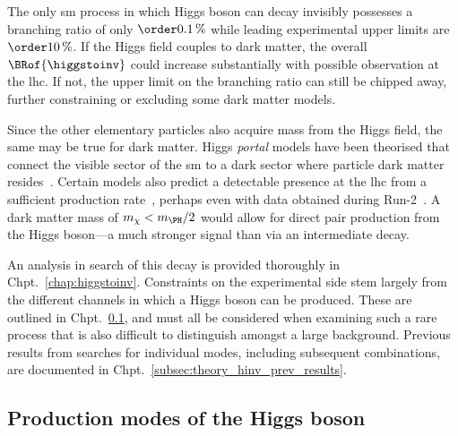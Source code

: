 The only \acrshort{sm} process in which Higgs boson can decay invisibly possesses a branching ratio of only $\order{\text{0.1\,\%}}$ while leading experimental upper limits are $\order{\text{10\,\%}}$. If the Higgs field couples to dark matter, the overall $\BRof{\higgstoinv}$ could increase substantially with possible observation at the \acrshort{lhc}. If not, the upper limit on the branching ratio can still be chipped away, further constraining or excluding some dark matter models. 

Since the other elementary particles also acquire mass from the Higgs field, the same may be true for dark matter. Higgs \emph{portal} models have been theorised that connect the visible sector of the \acrlong{sm} to a dark sector where particle dark matter resides~\cite{higgs_portal_singlet_dm,Arcadi:2019lka}. Certain models also predict a detectable presence at the \acrshort{lhc} from a sufficient production rate~\cite{Boveia:2018yeb}, perhaps even with data obtained during Run-2~\cite{Abercrombie:2015wmb}. A dark matter mass of $m_{\chi} < m_{\PH}/\text{2}$ would allow for direct pair production from the Higgs boson---a much stronger signal than via an intermediate decay.


An analysis in search of this decay is provided thoroughly in Chpt.~\ref{chap:higgstoinv}. Constraints on the experimental side stem largely from the different channels in which a Higgs boson can be produced. These are outlined in Chpt.~\ref{subsec:theory_higgs_production_modes}, and must all be considered when examining such a rare process that is also difficult to distinguish amongst a large background. Previous results from searches for individual modes, including subsequent combinations, are documented in Chpt.~\ref{subsec:theory_hinv_prev_results}.




\subsection{Production modes of the Higgs boson}
\label{subsec:theory_higgs_production_modes}

